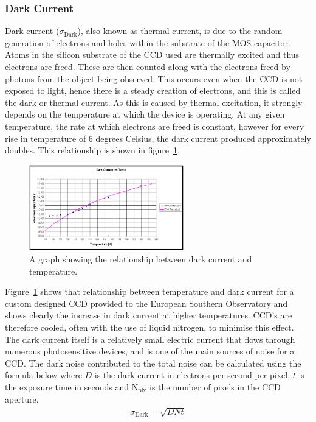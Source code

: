 		\subsubsection{Dark Current} %
		\label{ssub:dark_current}
			Dark current ($\sigma_\text{Dark}$), also known as thermal current, is due to the random generation of electrons and holes within the substrate of the MOS capacitor. Atoms in the silicon substrate of the CCD used are thermally excited and thus electrons are freed. These are then counted along with the electrons freed by photons from the object being observed. This occurs even when the CCD is not exposed to light, hence there is a steady creation of electrons, and this is called the dark or thermal current. As this is caused by thermal excitation, it strongly depends on the temperature at which the device is operating. At any given temperature, the rate at which electrons are freed is constant, however for every rise in temperature of 6 degrees Celsius, the dark current produced approximately doubles\cite{Astronomical_Image_Processing}. This relationship is shown in figure~\ref{fig:dark_current_vs_temp}\cite{Southern_Observatory_throughput}.
			\begin{figure}[H]
				\centering
				\includegraphics[width=0.6\textwidth]{../Images/Dark.png}
				\caption{A graph showing the relationship between dark current and temperature.\label{fig:dark_current_vs_temp}}
			\end{figure}

			Figure~\ref{fig:dark_current_vs_temp} shows that relationship between temperature and dark current for a custom designed CCD provided to the European Southern Observatory and shows clearly the increase in dark current at higher temperatures. CCD's are therefore cooled, often with the use of liquid nitrogen, to minimise this effect. The dark current itself is a relatively small electric current that flows through numerous photosensitive devices, and is one of the main sources of noise for a CCD. The dark noise contributed to the total noise can be calculated using the formula below where $D$ is the dark current in electrons per second per pixel, $t$ is the exposure time in seconds and N$_\text{pix}$ is the number of pixels in the CCD aperture.
			\begin{align}
				\sigma_\text{Dark} = \sqrt{DNt}
			\end{align}

